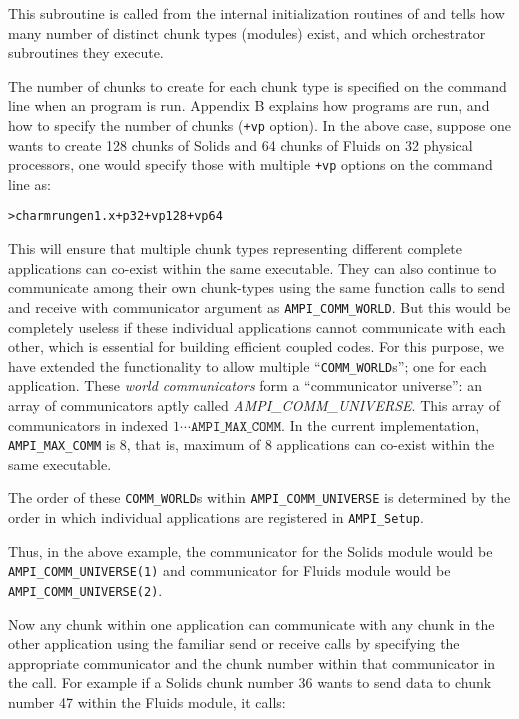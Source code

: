 \documentclass[10pt]{article}
\begin{document}
This subroutine is called from the internal initialization routines of \ampi{}
and tells \ampi{} how many number of distinct chunk types (modules) exist, and
which orchestrator subroutines they execute.

The number of chunks to create for each chunk type is specified on the command
line when an \ampi{} program is run. Appendix B explains how \ampi{} programs
are run, and how to specify the number of chunks (\verb|+vp| option). In the
above case, suppose one wants to create 128 chunks of Solids and 64 chunks of
Fluids on 32 physical processors, one would specify those with multiple
\verb|+vp| options on the command line as:

\begin{alltt}
> charmrun gen1.x +p 32 +vp 128 +vp 64
\end{alltt}

This will ensure that multiple chunk types representing different complete
applications can co-exist within the same executable. They can also continue to
communicate among their own chunk-types using the same \ampi{} function calls
to send and receive with communicator argument as \texttt{AMPI\_COMM\_WORLD}.
But this would be completely useless if these individual applications cannot
communicate with each other, which is essential for building efficient coupled
codes.  For this purpose, we have extended the \ampi{} functionality to allow
multiple ``\texttt{COMM\_WORLD}s''; one for each application. These \emph{world
communicators} form a ``communicator universe'': an array of communicators
aptly called \emph{AMPI\_COMM\_UNIVERSE}. This array of communicators in
indexed $1\cdots\texttt{AMPI\_MAX\_COMM}$. In the current implementation,
\texttt{AMPI\_MAX\_COMM} is 8, that is, maximum of 8 applications can co-exist
within the same executable.

The order of these \texttt{COMM\_WORLD}s within \texttt{AMPI\_COMM\_UNIVERSE}
is determined by the order in which individual applications are registered in
\texttt{AMPI\_Setup}.

Thus, in the above example, the communicator for the Solids module would be
\texttt{AMPI\_COMM\_UNIVERSE(1)} and communicator for Fluids module would be
\texttt{AMPI\_COMM\_UNIVERSE(2)}.

Now any chunk within one application can communicate with any chunk in the
other application using the familiar send or receive \ampi{} calls by
specifying the appropriate communicator and the chunk number within that
communicator in the call. For example if a Solids chunk number 36 wants to send
data to chunk number 47 within the Fluids module, it calls:
\end{document}
